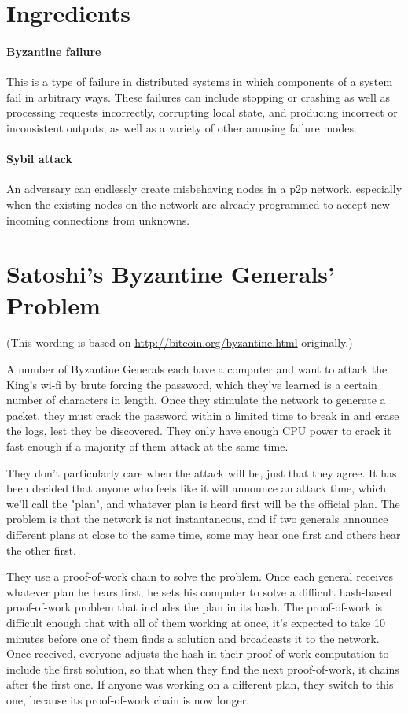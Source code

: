 \documentclass[letterpaper]{article}
\begin{document}
\section{Ingredients}

\paragraph{Byzantine failure} This is a type of failure in distributed systems
in which components of a system fail in arbitrary ways. These failures can
include stopping or crashing as well as processing requests incorrectly,
corrupting local state, and producing incorrect or inconsistent outputs, as
well as a variety of other amusing failure modes.

\paragraph{Sybil attack} An adversary can endlessly create misbehaving nodes in
a p2p network, especially when the existing nodes on the network are already
programmed to accept new incoming connections from unknowns.

\section{Satoshi's Byzantine Generals' Problem}

(This wording is based on \url{http://bitcoin.org/byzantine.html} originally.)

A number of Byzantine Generals each have a computer and want to attack the
King's wi-fi by brute forcing the password, which they've learned is a certain
number of characters in length. Once they stimulate the network to generate a
packet, they must crack the password within a limited time to break in and
erase the logs, lest they be discovered. They only have enough CPU power to
crack it fast enough if a majority of them attack at the same time.

They don't particularly care when the attack will be, just that they agree. It
has been decided that anyone who feels like it will announce an attack time,
which we'll call the "plan", and whatever plan is heard first will be the
official plan. The problem is that the network is not instantaneous, and if two
generals announce different plans at close to the same time, some may hear one
first and others hear the other first.

They use a proof-of-work chain to solve the problem. Once each general receives
whatever plan he hears first, he sets his computer to solve a difficult
hash-based proof-of-work problem that includes the plan in its hash. The
proof-of-work is difficult enough that with all of them working at once, it's
expected to take 10 minutes before one of them finds a solution and broadcasts
it to the network. Once received, everyone adjusts the hash in their
proof-of-work computation to include the first solution, so that when they find
the next proof-of-work, it chains after the first one. If anyone was working on
a different plan, they switch to this one, because its proof-of-work chain is
now longer.
\end{document}

